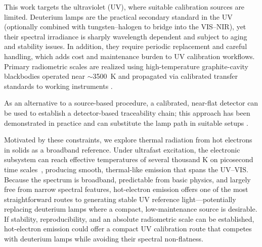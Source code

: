 \documentclass[
	parskip=half,
	a4paper,
]{scrarticle}
\begin{document}
This work targets the ultraviolet (UV), where suitable calibration sources are limited. Deuterium lamps are the practical secondary standard in the UV (optionally combined with tungsten–halogen to bridge into the VIS–NIR), yet their spectral irradiance is sharply wavelength dependent and subject to aging and stability issues. In addition, they require periodic replacement and careful handling, which adds cost and maintenance burden to UV calibration workflows. Primary radiometric scales are realized using high-temperature graphite-cavity blackbodies operated near $\sim$\SI{3500}{\kelvin} and propagated via calibrated transfer standards to working instruments \cite{yoon_nist_2011,sapritsky_black-body_1995}.

As an alternative to a source-based procedure, a calibrated, near-flat detector can be used to establish a detector-based traceability chain; this approach has been demonstrated in practice and can substitute the lamp path in suitable setups \cite{larason_nist_1996}.

Motivated by these constraints, we explore thermal radiation from hot electrons in solids as a broadband reference. Under ultrafast excitation, the electronic subsystem can reach effective temperatures of several thousand \si{\kelvin} on picosecond time scales~\cite{lui_ultrafast_2010}, producing smooth, thermal-like emission that spans the UV–VIS. Because the spectrum is broadband, predictable from basic physics, and largely free from narrow spectral features, hot-electron emission offers one of the most straightforward routes to generating stable UV reference light—potentially replacing deuterium lamps where a compact, low-maintenance source is desirable. If stability, reproducibility, and an absolute radiometric scale can be established, hot-electron emission could offer a compact UV calibration route that competes with deuterium lamps while avoiding their spectral non-flatness.
\end{document}

